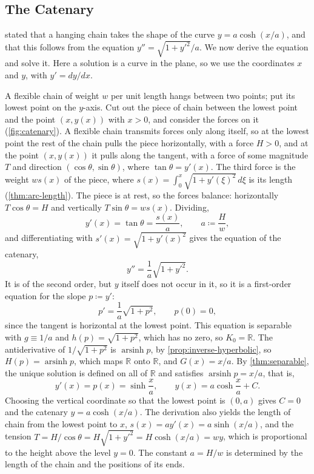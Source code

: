 \subsection{The Catenary}
\label{subsec:catenary}

 stated that a hanging chain takes the shape of the curve $y=a\cosh(x/a)$, and that this follows from the equation $y''=\sqrt{1+y'^2}/a$. We now derive the equation and solve it. Here a solution is a curve in the plane, so we use the coordinates $x$ and $y$, with $y'=dy/dx$.

A flexible chain of weight $w$ per unit length hangs between two points; put its lowest point on the $y$-axis. Cut out the piece of chain between the lowest point and the point $(x,y(x))$ with $x>0$, and consider the forces on it (\cref{fig:catenary}). A flexible chain transmits forces only along itself, so at the lowest point the rest of the chain pulls the piece horizontally, with a force $H>0$, and at the point $(x,y(x))$ it pulls along the tangent, with a force of some magnitude $T$ and direction $(\cos\theta,\sin\theta)$, where $\tan\theta=y'(x)$. The third force is the weight $ws(x)$ of the piece, where $s(x)=\int_0^x\sqrt{1+y'(\xi)^2}\,d\xi$ is its length (\cref{thm:arc-length}). The piece is at rest, so the forces balance: horizontally $T\cos\theta=H$ and vertically $T\sin\theta=ws(x)$. Dividing,
\[
y'(x)=\tan\theta=\frac{s(x)}a,\qquad a\coloneqq\frac Hw ,
\]
and differentiating with $s'(x)=\sqrt{1+y'(x)^2}$ gives the equation of the catenary,
\begin{equation}
y''=\frac1a\sqrt{1+y'^2} .
\label{eq:catenary}
\end{equation}
It is of the second order, but $y$ itself does not occur in it, so it is a first-order equation for the slope $p\coloneqq y'$:
\[
p'=\frac1a\sqrt{1+p^2},\qquad p(0)=0 ,
\]
since the tangent is horizontal at the lowest point. This equation is separable with $g\equiv1/a$ and $h(p)=\sqrt{1+p^2}$, which has no zero, so $K_0=\mathbb R$. The antiderivative of $1/\sqrt{1+p^2}$ is $\operatorname{arsinh}p$, by \cref{prop:inverse-hyperbolic}, so $H(p)=\operatorname{arsinh}p$, which maps $\mathbb R$ onto $\mathbb R$, and $G(x)=x/a$. By \cref{thm:separable}, the unique solution is defined on all of $\mathbb R$ and satisfies $\operatorname{arsinh}p=x/a$, that is,
\[
y'(x)=p(x)=\sinh\frac xa,\qquad y(x)=a\cosh\frac xa+C .
\]
Choosing the vertical coordinate so that the lowest point is $(0,a)$ gives $C=0$ and the catenary $y=a\cosh(x/a)$. The derivation also yields the length of chain from the lowest point to $x$, $s(x)=ay'(x)=a\sinh(x/a)$, and the tension $T=H/\cos\theta=H\sqrt{1+y'^2}=H\cosh(x/a)=wy$, which is proportional to the height above the level $y=0$. The constant $a=H/w$ is determined by the length of the chain and the positions of its ends.


